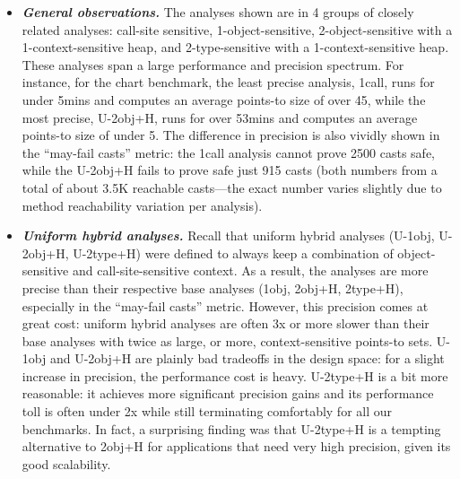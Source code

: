 \begin{itemize}

\item \textbf{\emph{General observations.}}
The analyses shown are in 4 
groups of closely related analyses: call-site sensitive,
1-object-sensitive, 2-object-sensitive with a 1-context-sensitive
heap, and 2-type-sensitive with a 1-context-sensitive heap. 
These analyses span a large performance and precision spectrum.
For instance, for the chart benchmark, the least precise analysis,
1call, runs for under 5mins and computes an average points-to size of
over 45, while the most precise, U-2obj+H, runs for over 53mins and
computes an average points-to size of under 5. The difference in
precision is also vividly shown in the ``may-fail casts'' metric: the
1call analysis cannot prove 2500 casts safe, while the U-2obj+H fails
to prove safe just 915 casts (both numbers from a total of about 3.5K
reachable casts---the exact number varies slightly due to method
reachability variation per analysis). 


\item \textbf{\emph{Uniform hybrid analyses.}}  Recall that uniform
hybrid analyses (U-1obj, U-2obj+H, U-2type+H) were defined to always
keep a combination of object-sensitive and call-site-sensitive
context. As a result, the analyses are more precise than their
respective base analyses (1obj, 2obj+H, 2type+H), especially in the
``may-fail casts'' metric. However, this precision comes at great
cost: uniform hybrid analyses are often 3x or more slower than their
base analyses with twice as large, or more, context-sensitive
points-to sets. U-1obj and U-2obj+H are plainly bad tradeoffs in the
design space: for a slight increase in precision, the performance cost
is heavy. U-2type+H is a bit more reasonable: it achieves more
significant precision gains and its performance toll is often under 2x
while still terminating comfortably for all our benchmarks. In fact, a
surprising finding was that U-2type+H is a tempting alternative to
2obj+H for applications that need very high precision, given its good
scalability.


\end{itemize}
